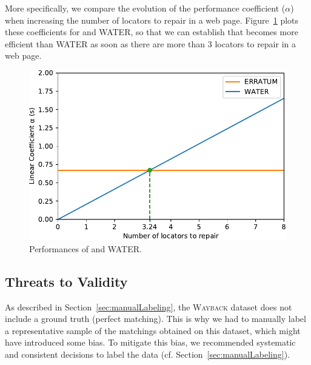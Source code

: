 More specifically, we compare the evolution of the performance coefficient ($\alpha$) when increasing the number of locators to repair in a web page.
Figure~\ref{fig:comparisonLinearCoefficients} plots these coefficients for \erratum and WATER, so that we can establish that \erratum{} becomes more efficient than WATER as soon as there are more than 3 locators to repair in a web page.

\begin{figure}[]
  \centering
  \includegraphics[width=.75\linewidth]{erratum/linearRegression}
  \caption{Performances of \erratum and WATER.}
  \label{fig:comparisonLinearCoefficients}
\end{figure}





\subsection{Threats to Validity}\label{sec:threats}
As described in Section~\ref{sec:manualLabeling}, the \textsc{Wayback} dataset does not include a ground truth (perfect matching).
This is why we had to manually label a representative sample of the matchings obtained on this dataset, which might have introduced some bias.
To mitigate this bias, we recommended systematic and consistent decisions to label the data (cf. Section~\ref{sec:manualLabeling}). 

